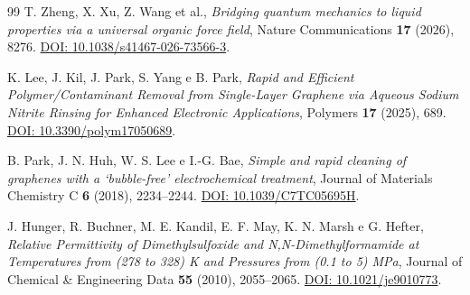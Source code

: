 \documentclass[11pt,reqno]{amsart}
\numberwithin{equation}{section}
\begin{document}
\begin{thebibliography}{99}
T. Zheng, X. Xu, Z. Wang et al.,
\emph{Bridging quantum mechanics to liquid properties via a universal
organic force field}, Nature Communications \textbf{17} (2026), 8276.
\href{https://doi.org/10.1038/s41467-026-73566-3}{DOI: 10.1038/s41467-026-73566-3}.

K. Lee, J. Kil, J. Park, S. Yang e B. Park,
\emph{Rapid and Efficient Polymer/Contaminant Removal from Single-Layer
Graphene via Aqueous Sodium Nitrite Rinsing for Enhanced Electronic Applications},
Polymers \textbf{17} (2025), 689.
\href{https://doi.org/10.3390/polym17050689}{DOI: 10.3390/polym17050689}.

B. Park, J. N. Huh, W. S. Lee e I.-G. Bae,
\emph{Simple and rapid cleaning of graphenes with a `bubble-free'
electrochemical treatment}, Journal of Materials Chemistry C
\textbf{6} (2018), 2234--2244.
\href{https://doi.org/10.1039/C7TC05695H}{DOI: 10.1039/C7TC05695H}.

J. Hunger, R. Buchner, M. E. Kandil, E. F. May, K. N. Marsh e G. Hefter,
\emph{Relative Permittivity of Dimethylsulfoxide and N,N-Dimethylformamide
at Temperatures from (278 to 328) K and Pressures from (0.1 to 5) MPa},
Journal of Chemical \& Engineering Data \textbf{55} (2010), 2055--2065.
\href{https://doi.org/10.1021/je9010773}{DOI: 10.1021/je9010773}.

\end{thebibliography}
\end{document}
